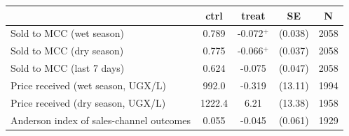 \begin{tabular}{lcccc}
\hline\hline
 & ctrl & treat & SE & N \\
\hline
Sold to MCC (wet season) & 0.789 & -0.072$^{+}$ & (0.038) & 2058 \\
Sold to MCC (dry season) & 0.775 & -0.066$^{+}$ & (0.037) & 2058 \\
Sold to MCC (last 7 days) & 0.624 & -0.075 & (0.047) & 2058 \\
Price received (wet season, UGX/L) & 992.0 & -0.319 & (13.11) & 1994 \\
Price received (dry season, UGX/L) & 1222.4 & 6.21 & (13.38) & 1958 \\
Anderson index of sales-channel outcomes & 0.055 & -0.045 & (0.061) & 1929 \\
\hline\hline
\end{tabular}
